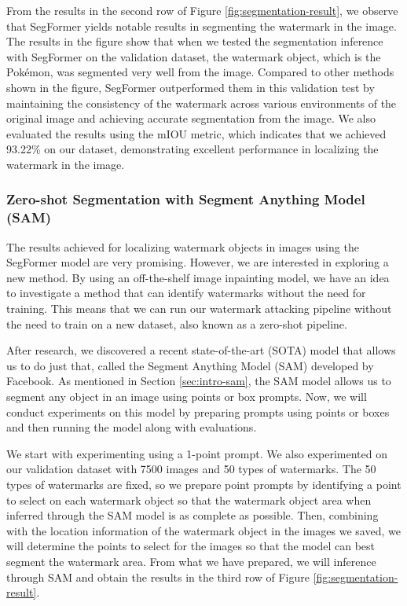 From the results in the second row of Figure \ref{fig:segmentation-result}, we observe that SegFormer yields notable results in segmenting the watermark in the image. The results in the figure show that when we tested the segmentation inference with SegFormer on the validation dataset, the watermark object, which is the Pokémon, was segmented very well from the image. Compared to other methods shown in the figure, SegFormer outperformed them in this validation test by maintaining the consistency of the watermark across various environments of the original image and achieving accurate segmentation from the image. We also evaluated the results using the mIOU metric, which indicates that we achieved 93.22\% on our dataset, demonstrating excellent performance in localizing the watermark in the image.


\subsubsection{Zero-shot Segmentation with Segment Anything Model (SAM)}
The results achieved for localizing watermark objects in images using the SegFormer model are very promising. However, we are interested in exploring a new method. By using an off-the-shelf image inpainting model, we have an idea to investigate a method that can identify watermarks without the need for training. This means that we can run our watermark attacking pipeline without the need to train on a new dataset, also known as a zero-shot pipeline.

After research, we discovered a recent state-of-the-art (SOTA) model that allows us to do just that, called the Segment Anything Model (SAM) developed by Facebook. As mentioned in Section \ref{sec:intro-sam}, the SAM model allows us to segment any object in an image using points or box prompts. Now, we will conduct experiments on this model by preparing prompts using points or boxes and then running the model along with evaluations.

We start with experimenting using a 1-point prompt. We also experimented on our validation dataset with 7500 images and 50 types of watermarks. The 50 types of watermarks are fixed, so we prepare point prompts by identifying a point to select on each watermark object so that the watermark object area when inferred through the SAM model is as complete as possible. Then, combining with the location information of the watermark object in the images we saved, we will determine the points to select for the images so that the model can best segment the watermark area. From what we have prepared, we will inference through SAM and obtain the results in the third row of Figure \ref{fig:segmentation-result}.

